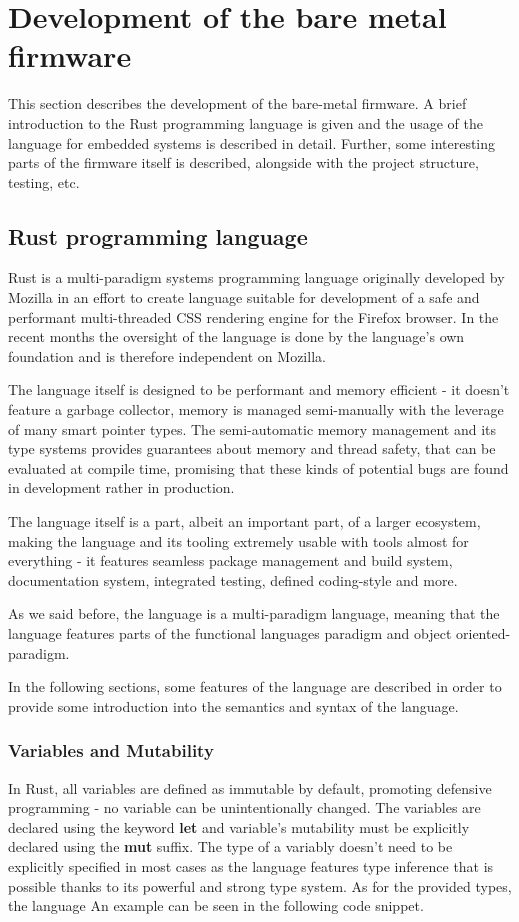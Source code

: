 \section{Development of the bare metal firmware}
\label{sec:firmware}
This section describes the development of the bare-metal firmware.
A brief introduction to the Rust programming language is given and the usage of the language for embedded systems is described in detail.
Further, some interesting parts of the firmware itself is described, alongside with the project structure, testing, etc.

\subsection{Rust programming language}
\label{subsec:rust}
Rust is a multi-paradigm systems programming language originally developed by Mozilla\cite{rust_authorship} in an effort to create language suitable for development of a safe and performant multi-threaded CSS rendering engine for the Firefox browser\cite{servo}.
In the recent months the oversight of the language is done by the language's own foundation and is therefore independent on Mozilla\cite{rust_foundation}.

The language itself is designed to be performant and memory efficient - it doesn't feature a garbage collector, memory is managed semi-manually with the leverage of many smart pointer types.
The semi-automatic memory management and its type systems provides guarantees about memory and thread safety, that can be evaluated at compile time, promising that these kinds of potential bugs are found in development rather in production.

The language itself is a part, albeit an important part, of a larger ecosystem, making the language and its tooling extremely usable with tools almost for everything - it features seamless package management and build system, documentation system, integrated testing, defined coding-style and more.

As we said before, the language is a multi-paradigm language, meaning that the language features parts of the functional languages paradigm and object oriented-paradigm.

In the following sections, some features of the language are described in order to provide some introduction into the semantics and syntax of the language.

\subsubsection{Variables and Mutability}
In Rust, all variables are defined as immutable by default, promoting defensive programming - no variable can be unintentionally changed.
The variables are declared using the keyword \textbf{let} and variable's mutability must be explicitly declared using the \textbf{mut} suffix.
The type of a variably doesn't need to be explicitly specified in most cases as the language features type inference that is possible thanks to its powerful and strong type system.
As for the provided types, the language
An example can be seen in the following code snippet.

